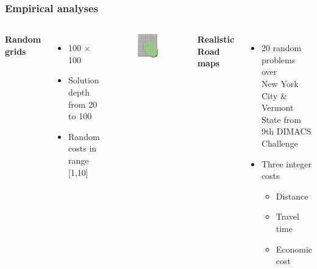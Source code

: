 \begin{frame} 
\frametitle{Empirical analyses}
\begin{columns}[onlytextwidth, t]
	\textbf{Random grids}
	\begin{itemize}
		\item 100 $\times$ 100
		\item \textcolor{ao}{Solution depth from 20 to 100}
		\item Random costs in range [1,10]
	\end{itemize}
	\vspace{2mm}
	\begin{figure}
    	\centering
		\includegraphics[scale=0.18]{figs/grids}
	\end{figure}
	\textbf{Realistic Road maps}
	\begin{itemize}
		\item 20 random problems over \\ New York City \& Vermont State from 9th DIMACS Challenge
		\item \textcolor{ao}{Three} integer costs
		\begin{itemize}
			\item Distance 
			\item Travel time
			\item Economic cost

\end{itemize}
\end{itemize}
\end{columns}
\end{frame}
